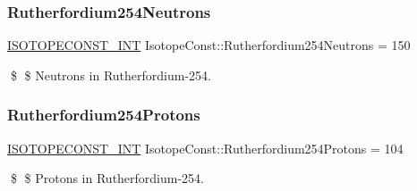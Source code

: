 \subsubsection{\texorpdfstring{Rutherfordium254\+Neutrons}{Rutherfordium254Neutrons}}
{\footnotesize\ttfamily \mbox{\hyperlink{group___isotope_const-_macros_ga5f18360b3e99483a35c32d789e62621c}{I\+S\+O\+T\+O\+P\+E\+C\+O\+N\+S\+T\+\_\+\+I\+NT}} Isotope\+Const\+::\+Rutherfordium254\+Neutrons = 150}

\$ \$ Neutrons in Rutherfordium-\/254. \mbox{\label{group___isotope_const-_rutherfordium-_rf254_gab07f421d1c891a7dbb07b7503111d3e7}} 
\subsubsection{\texorpdfstring{Rutherfordium254\+Protons}{Rutherfordium254Protons}}
{\footnotesize\ttfamily \mbox{\hyperlink{group___isotope_const-_macros_ga5f18360b3e99483a35c32d789e62621c}{I\+S\+O\+T\+O\+P\+E\+C\+O\+N\+S\+T\+\_\+\+I\+NT}} Isotope\+Const\+::\+Rutherfordium254\+Protons = 104}

\$ \$ Protons in Rutherfordium-\/254. 